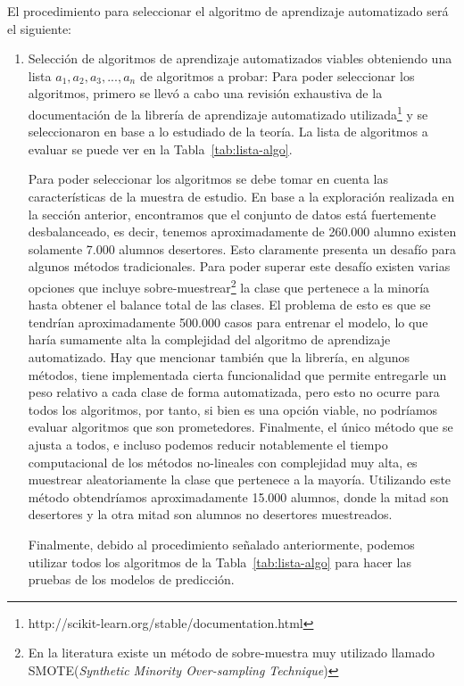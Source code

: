 El procedimiento para seleccionar el algoritmo de aprendizaje automatizado será el siguiente:
\begin{enumerate}
\item Selección de algoritmos de aprendizaje automatizados viables obteniendo una lista $a_1, a_2, a_3, ..., a_n$ de algoritmos a probar: Para poder seleccionar los algoritmos, primero se llevó a cabo una revisión exhaustiva de la documentación de la librería de aprendizaje automatizado utilizada\footnote{http://scikit-learn.org/stable/documentation.html} y se seleccionaron en base a lo estudiado de la teoría. La lista de algoritmos a evaluar se puede ver en la Tabla~\ref{tab:lista-algo}.

Para poder seleccionar los algoritmos se debe tomar en cuenta las características de la muestra de estudio. En base a la exploración realizada en la sección anterior, encontramos que el conjunto de datos está fuertemente desbalanceado, es decir, tenemos aproximadamente de 260.000 alumno existen solamente 7.000 alumnos desertores. Esto claramente presenta un desafío para algunos métodos tradicionales. Para poder superar este desafío existen varias opciones que incluye sobre-muestrear\footnote{En la literatura existe un método de sobre-muestra muy utilizado llamado SMOTE(\textit{Synthetic Minority Over-sampling Technique})\cite{Chawla02smote:synthetic}} la clase que pertenece a la minoría hasta obtener el balance total de las clases. El problema de esto es que se tendrían aproximadamente 500.000 casos para entrenar el modelo, lo que haría sumamente alta la complejidad del algoritmo de aprendizaje automatizado. Hay que mencionar también que la librería, en algunos métodos, tiene implementada cierta funcionalidad que permite entregarle un peso relativo a cada clase de forma automatizada, pero esto no ocurre para todos los algoritmos, por tanto, si bien es una opción viable, no podríamos evaluar algoritmos que son prometedores. Finalmente, el único método que se ajusta a todos, e incluso podemos reducir notablemente el tiempo computacional de los métodos no-lineales con complejidad muy alta, es muestrear aleatoriamente la clase que pertenece a la mayoría. Utilizando este método obtendríamos aproximadamente 15.000 alumnos, donde la mitad son desertores y la otra mitad son alumnos no desertores muestreados.

Finalmente, debido al procedimiento señalado anteriormente, podemos utilizar todos los algoritmos de la Tabla~\ref{tab:lista-algo} para hacer las pruebas de los modelos de predicción.


\end{enumerate}
